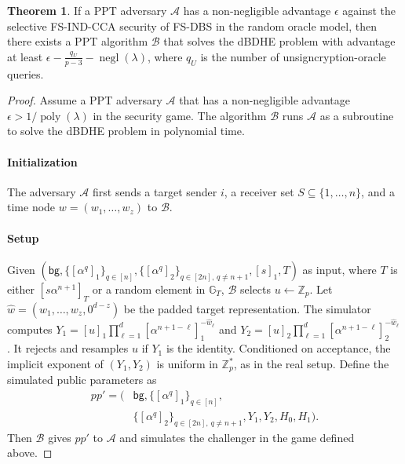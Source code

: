 \documentclass[sigconf,anonymous]{acmart}
\theoremstyle{definition}
\theoremstyle{definition}
\theoremstyle{definition}
\theoremstyle{definition}
\theoremstyle{definition}
\theoremstyle{definition}
\theoremstyle{definition}
\theoremstyle{definition}
\theoremstyle{definition}
\newtheorem{theorem}{Theorem}
\begin{document}
\begin{theorem}
	\label{theorem:CCA}
	If a PPT adversary $\mathcal{A}$ has a non-negligible advantage
	$\epsilon$ against the selective FS-IND-CCA security of FS-DBS in
	the random oracle model, then there exists a PPT algorithm
	$\mathcal{B}$ that solves the dBDHE problem with advantage at least
	$\epsilon-\frac{q_U}{p-3}-\operatorname{negl}(\lambda)$, where $q_U$
	is the number of unsigncryption-oracle queries.
\end{theorem}
\begin{proof}
	Assume a PPT adversary $\mathcal{A}$ that has a non-negligible advantage
	$\epsilon>1/\operatorname{poly}(\lambda)$ in the security game.
	The algorithm $\mathcal{B}$ runs $\mathcal{A}$ as a subroutine to solve
	the dBDHE problem in polynomial time.
	
	\paragraph{\textbf{Initialization}}
	The adversary $\mathcal{A}$ first sends a target sender $i$, a receiver
	set $S\subseteq\{1,\ldots,n\}$, and a time node
	$w=(w_1,\ldots,w_z)$ to $\mathcal{B}$.
	
	\paragraph{\textbf{Setup}}
	Given
	$(\mathsf{bg},
	\{[\alpha^q]_1\}_{q\in[n]},
	\{[\alpha^q]_2\}_{q\in[2n],\,q\neq n+1},
	[s]_1,T)$
	as input, where $T$ is either
	$[s\alpha^{n+1}]_T$ or a random element in $\mathbb{G}_T$,
	$\mathcal{B}$ selects $u\leftarrow\mathbb{Z}_p$.
	Let $\widehat w=(w_1,\ldots,w_z,0^{d-z})$ be the padded target
	representation. The simulator computes
	$Y_1=[u]_1\prod_{\ell=1}^{d}
	[\alpha^{n+1-\ell}]_1^{-\widehat w_\ell}$ and
	$Y_2=[u]_2\prod_{\ell=1}^{d}
	[\alpha^{n+1-\ell}]_2^{-\widehat w_\ell}$. It rejects and resamples
	$u$ if $Y_1$ is the identity. Conditioned on acceptance, the implicit
	exponent of $(Y_1,Y_2)$ is uniform in $\mathbb{Z}_p^*$, as in the real
	setup.
	Define the simulated public parameters as
	\[
	\begin{aligned}
	pp' = \bigl(&\mathsf{bg},\{[\alpha^q]_1\}_{q\in[n]},\\
	&\{[\alpha^q]_2\}_{q\in[2n],\,q\neq n+1},
	Y_1,Y_2,H_0,H_1\bigr).
	\end{aligned}
	\]
	Then $\mathcal{B}$ gives $pp'$ to $\mathcal{A}$ and simulates the
	challenger in the game defined above.
	

\end{proof}
\end{document}
